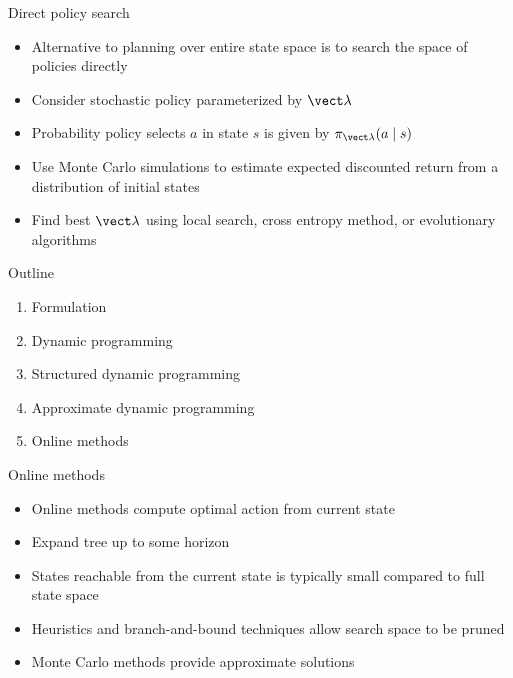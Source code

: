 \documentclass[handout]{dmu}
\begin{document}
\begin{frame}{Direct policy search}
\begin{itemize}
\item<1-> Alternative to planning over entire state space is to search the space of \alert<1>{policies} directly
\item<2-> Consider stochastic policy parameterized by $\vect \lambda$
\item<3-> Probability policy selects $a$ in state $s$ is given by $\pi_{\vect \lambda}(a \mid s)$
\item<4-> Use Monte Carlo simulations to estimate expected discounted return from a distribution of initial states
\item<5-> Find best $\vect\lambda$ using local search, cross entropy method, or evolutionary algorithms
\end{itemize}
\end{frame}

\begin{frame}{Outline}
\begin{enumerate}
\item Formulation
\item Dynamic programming
\item Structured dynamic programming
\item Approximate dynamic programming
\item \alert{Online methods}
\end{enumerate}
\end{frame}

\begin{frame}{Online methods}
\begin{itemize}
\item<1-> Online methods compute optimal action from current state
\item<2-> Expand tree up to some horizon
\item<3-> States reachable from the current state is typically small compared to full state space
\item<4-> Heuristics and branch-and-bound techniques allow search space to be pruned
\item<5-> Monte Carlo methods provide approximate solutions
\end{itemize}
\end{frame}
\end{document}
